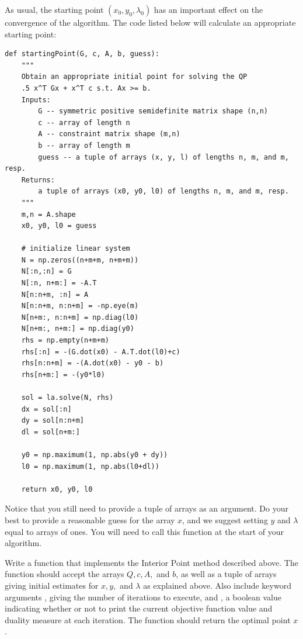 As usual, the starting point $(x_0, y_0, \lambda_0)$ has an important effect on the convergence of the algorithm.
The code listed below will calculate an appropriate starting point:
\begin{lstlisting}
def startingPoint(G, c, A, b, guess):
    """
    Obtain an appropriate initial point for solving the QP
    .5 x^T Gx + x^T c s.t. Ax >= b.
    Inputs:
        G -- symmetric positive semidefinite matrix shape (n,n)
        c -- array of length n
        A -- constraint matrix shape (m,n)
        b -- array of length m
        guess -- a tuple of arrays (x, y, l) of lengths n, m, and m, resp.
    Returns:
        a tuple of arrays (x0, y0, l0) of lengths n, m, and m, resp.
    """
    m,n = A.shape
    x0, y0, l0 = guess

    # initialize linear system
    N = np.zeros((n+m+m, n+m+m))
    N[:n,:n] = G
    N[:n, n+m:] = -A.T
    N[n:n+m, :n] = A
    N[n:n+m, n:n+m] = -np.eye(m)
    N[n+m:, n:n+m] = np.diag(l0)
    N[n+m:, n+m:] = np.diag(y0)
    rhs = np.empty(n+m+m)
    rhs[:n] = -(G.dot(x0) - A.T.dot(l0)+c)
    rhs[n:n+m] = -(A.dot(x0) - y0 - b)
    rhs[n+m:] = -(y0*l0)

    sol = la.solve(N, rhs)
    dx = sol[:n]
    dy = sol[n:n+m]
    dl = sol[n+m:]

    y0 = np.maximum(1, np.abs(y0 + dy))
    l0 = np.maximum(1, np.abs(l0+dl))

    return x0, y0, l0
\end{lstlisting}
Notice that you still need to provide a tuple of arrays  as an argument.
Do your best to provide a reasonable guess for the array $x$, and we suggest setting $y$ and $\lambda$
equal to arrays of ones. You will need to call this function at the start of your algorithm.

\begin{problem}
Write a function  that implements the Interior Point method described above.
The function should accept the arrays $Q, c, A,$ and $b$, as well as a tuple of arrays 
giving initial estimates for $x, y,$ and $\lambda$ as explained above. Also include keyword
arguments , giving the number of iterations to execute, and , a boolean value
indicating whether or not to print the current objective function value and duality measure at each
iteration. The function should return the optimal point $x$.
\end{problem}

